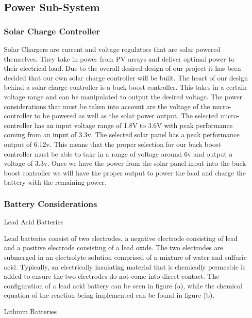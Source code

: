 \subsection{Power Sub-System}
\subsubsection{Solar Charge Controller}
Solar Chargers are current and voltage regulators that are solar powered themselves. They take in power from PV arrays and deliver optimal power to their electrical load. Due to the overall desired design of our project it has been decided that our own solar charge controller will be built. The heart of our design behind a solar charge controller is a buck boost controller. This takes in a certain voltage range and can be manipulated to output the desired voltage. The power considerations that must be taken into account are the voltage of the micro-controller to be powered as well as the solar power output. The selected micro-controller has an input voltage range of 1.8V to 3.6V with peak performance coming from an input of 3.3v. The selected solar panel has a peak performance output of 6.12v. This means that the proper selection for our buck boost controller must be able to take in a range of voltage around 6v and output a voltage of 3.3v. Once we have the power from the solar panel input into the buck boost controller we will have the proper output to power the load and charge the battery with the remaining power.
\subsubsection{Battery Considerations}
Lead Acid Batteries 

Lead batteries consist of two electrodes, a negative electrode consisting of lead and a positive electrode consisting of a lead oxide. The two electrodes are submerged in an electrolyte solution comprised of a mixture of water and sulfuric acid. Typically, an electrically insulating material that is chemically permeable is added to ensure the two electrodes do not come into direct contact. The configuration of a lead acid battery can be seen in figure (a), while the chemical equation of the reaction being implemented can be found in figure (b).

Lithium Batteries 

